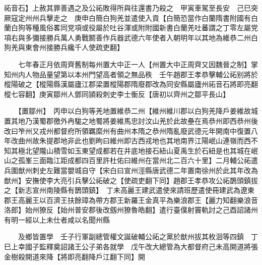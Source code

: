 祏音石】上赦其罪善遇之及公祏敗得所與往還書乃殺之　甲寅車駕至長安　己巳突厥寇定州州兵擊走之　庚申白簡白狗羌並遣使入貢【白簡恐當作白蘭隋書附國有白蘭白狗等種風俗畧同党項或役屬於吐谷渾或附附國新書白蘭羌吐蕃謂之丁零左屬党項右與多彌接勝兵萬人勇戰鬭善作兵器武德六年使者入朝明年以其地為維恭二州白狗羌與東會州接勝兵纔千人使疏吏翻】

　　七年春正月依周齊舊制每州置大中正一人【州置大中正周齊又因魏晉之制】掌知州内人物品量望第以本州門望高者領之無品秩　壬午趙郡王孝恭擊輔公祏别將於樅陽破之【樅陽縣漢屬廬江郡梁置樅陽郡隋廢郡改為同安縣屬廬州祏音石將即亮翻樅七容翻】庚寅鄒州人鄧同頴殺刺史李士衡反【唐初以齊州之鄒平長山】

　　【置鄒州】　丙申以白狗等羌地置維恭二州【維州維川郡以白狗羌降戶姜維故城置其地乃漢蜀郡徼外冉駹之地蜀將姜維馬忠討汶山羌於此故壘在焉恭州即西恭州後改曰笮州又戎州都督府所領羈縻州有曲州本隋之恭州隋亂廢武德元年開南中復置八年改曲州故朱提郡地非此也劉昫曰維州即古西戎地也其地南界江陽岷山連嶺而西不知其極北望隴山積雪如玉東望成都若在井底地接石紐山夏禹生於石紐是也其城在岷山之孤峯三面臨江距成都四百里許杜佑曰維州在當州北二百六十里】二月輔公祏遣兵圍猷州刺史左難當嬰城自守【宋白曰宣州涇縣唐武德二年置南徐州於此其年改為猷州】安撫使李大亮引兵擊公祏破之【使疏吏翻下同】趙郡王孝恭攻公祏鵲頭鎮拔之【新志宣州南陵縣有鵲頭鎮】　丁未高麗王建武遣使來請班歷遣使冊建武為遼東郡王高麗王以百濟王扶餘璋為帶方郡王新羅王金真平為樂浪郡王【麗力知翻樂浪音洛郎】始州獠反【始州普安郡後改劔州獠魯皓翻】遣行臺僕射竇軌討之己酉詔諸州有明一經以上未仕者咸以名聞州縣

　　及鄉皆置學　壬子行軍副總管權文誕破輔公祏之黨於猷州拔其枚洄等四鎮　丁巳上幸國子監釋奠詔諸王公子弟各就學　戊午改大總管為大都督府己未高開道將張金樹殺開道來降【將即亮翻降戶江翻下同】開

